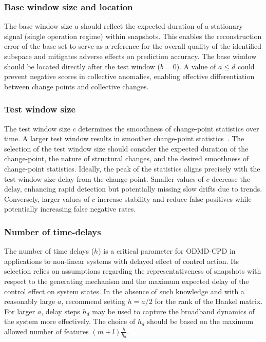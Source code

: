 \subsubsection{Base window size and location}\label{sec:base-window}
The base window size \(a\) should reflect the expected duration of a stationary signal (single operation regime) within snapshots. This enables the reconstruction error of the base set to serve as a reference for the overall quality of the identified subspace and mitigates adverse effects on prediction accuracy. The base window should be located directly after the test window (\(b = 0\)). A value of \(a \leq d\) could prevent negative scores in collective anomalies, enabling effective differentiation between change points and collective changes.

\subsubsection{Test window size}
The test window size \(c\) determines the smoothness of change-point statistics over time. A larger test window results in smoother change-point statistics~\citep{Moskvina2003}. The selection of the test window size should consider the expected duration of the change-point, the nature of structural changes, and the desired smoothness of change-point statistics. Ideally, the peak of the statistics aligns precisely with the test window size delay from the change point. Smaller values of \(c\) decrease the delay, enhancing rapid detection but potentially missing slow drifts due to trends. Conversely, larger values of \(c\) increase stability and reduce false positives while potentially increasing false negative rates.

\subsubsection{Number of time-delays}
The number of time delays (\(h\)) is a critical parameter for ODMD-CPD in applications to non-linear systems with delayed effect of control action. Its selection relies on assumptions regarding the representativeness of snapshots with respect to the generating mechanism and the maximum expected delay of the control effect on system states. In the absence of such knowledge and with a reasonably large \(a\), \citet{Moskvina2003} recommend setting \(h = a / 2\) for the rank of the Hankel matrix. For larger \(a\), delay steps \(h_d\) may be used to capture the broadband dynamics of the system more effectively. The choice of \(h_d\) should be based on the maximum allowed number of features \((m + l)\frac{h}{h_d}\).

